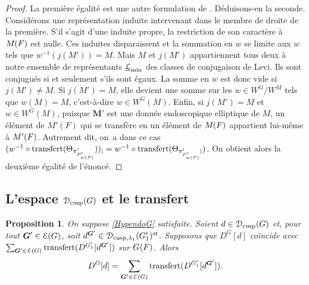 \documentclass[11pt]{article}
\newcommand{\Subsection}{\subsection}
\numberwithin{equation}{section}\providecommand{\og}{«\,}\providecommand{\fg}{\,»}
\let\mathcal \EuScript
\newcommand{\NoChangel}[1]{%
\expandafter\let\csname old\string#1\endcsname=#1
\let#1=\relax
\newcommand{#1}{\mathcode`l="716C\csname old\string#1\endcsname\mathcode`l="7160 }%
}
\newcommand{\cusp}{\mathrm{cusp}}
\newcommand{\rell}{\mathrm{ell}} \NoChangel{\rell}
\newcommand{\st}{\mathrm{st}}
\DeclareMathOperator{\transfert}{transfert}
\newcommand{\bG}{\boldsymbol{G}}
\newcommand{\bM}{\boldsymbol{M}}
\newcommand{\cD}{\mathcal{D}}
\newcommand{\cE}{\mathcal{E}}
\newcommand{\cL}{\mathcal{L}}
\theoremstyle{plain}
\newtheorem*{prop*}{Proposition}
\theoremstyle{definition}
\begin{document}
\begin{proof}
La première égalité est une autre formulation de \cite[Th.\,5.6]{H}. Déduisons-en la seconde. Considérons une représentation induite intervenant dans le membre de droite de la première. S'il s'agit d'une induite propre, la restriction de son caractère à $M_{\rell}(F)$ est nulle. Ces induites disparaissent et la sommation en $w$ se limite aux $w$ tels que $w^{-1}(j(M'))=M$. Mais $M$ et $j(M')$ appartiennent tous deux à notre ensemble de représentants $\underline{\cL}_{\min}$ des classes de conjugaison de Levi. Ils sont conjugués si et seulement s'ils sont égaux. La somme en $w$ est donc vide si $j(M')\neq M$. Si $j(M')=M$, elle devient une somme sur les $w\in W^G/W^M$ tels que $w(M)=M$, c'est-à-dire $w\in W^G(M)$. Enfin, si $j(M')=M$ et $w\in W^G(M)$, puisque $\bM'$ est une donnée endoscopique elliptique de $M$, un élément de $M'(F)$ qui se transfère en un élément de $M_{\rell}(F)$ appartient lui-même à $M'_{\rell}(F)$. Autrement dit, on~a dans ce cas $(w^{-1}\circ \transfert(\Theta_{\pi'_{P'_{w(P)}}}))_{\vert\rell}=w^{-1}\circ \transfert(\Theta_{\pi'_{P'_{w(P)}}\vert\rell})$. On obtient alors la deuxième égalité de l'énoncé.
\end{proof}

\Subsection{ L'espace \texorpdfstring{$\cD_{\cusp}(G)$}{DG} et le transfert}\label{finale}

\begin{prop*}
On suppose \ref{HypendoG} satisfaite. Soient $d\in \cD_{\cusp}(G)$ et, pour tout $\bG'\in \cE(G)$, soit $d^{\bG'}\in \cD_{\cusp,\lambda_{1}}(G'_{1})^{\st}$. Supposons que $D^G[d]$ coïncide avec $\sum_{\bG'\in \cE(G)}\transfert(D^{G'_{1}}[d^{\bG'}])$ sur $G_{\rell}(F)$. Alors\vspace*{-3pt}
\[
D^G[d]=\sum_{\bG'\in \cE(G)}\transfert(D^{G'_{1}}[d^{\bG'}]).
\]
\end{prop*}
\end{document}
